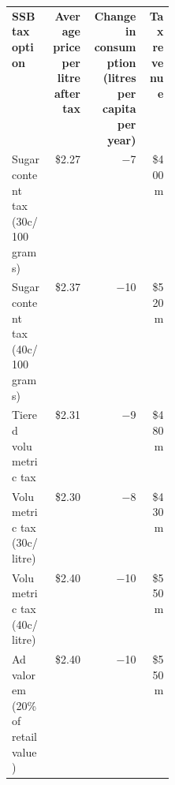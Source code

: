 \bgroup
\def\arraystretch{1.5}
\begin{tabularx}{\columnwidth}{p{0.24\linewidth}RRr}
\toprule
\textbf{SSB tax option} & \textbf{Average price per litre after~tax} & \textbf{Change in consumption (litres per capita per year)} & \textbf{Tax revenue} \\ \cmidrule(lr){1-4}
Sugar content tax (30c/100 grams) & \$2.27 & $-$7 & \$400m \\
Sugar content tax (40c/100 grams) & \$2.37 & $-$10 & \$520m \\
Tiered volumetric tax & \$2.31 & $-$9 & \$480m \\
Volumetric tax (30c/litre) & \$2.30 & $-$8 & \$430m \\
Volumetric tax (40c/litre) & \$2.40 & $-$10 & \$550m \\
Ad valorem (20\% of retail value) & \$2.40 & $-$10 & \$550m \\
\bottomrule
\end{tabularx}
\egroup